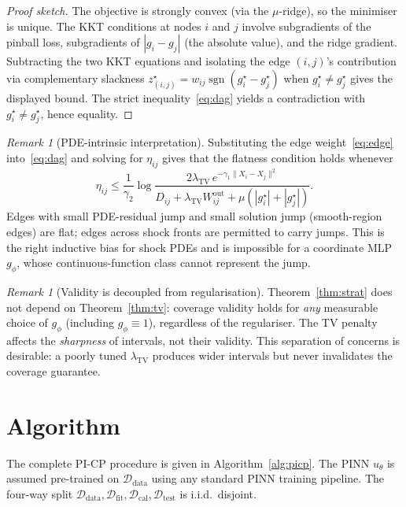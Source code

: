 \documentclass[11pt]{article}
\theoremstyle{definition}
\theoremstyle{remark}
\newtheorem{remark}[theorem]{Remark}
\newcommand{\Ddata}{\mathcal{D}_{\text{data}}}
\newcommand{\Dfit}{\mathcal{D}_{\text{fit}}}
\newcommand{\Dcal}{\mathcal{D}_{\text{cal}}}
\newcommand{\Dtest}{\mathcal{D}_{\text{test}}}
\newcommand{\TV}{\mathrm{TV}}
\begin{document}
\begin{proof}[Proof sketch]
The objective is strongly convex (via the $\mu$-ridge), so the minimiser is unique. The KKT conditions at nodes $i$ and $j$ involve subgradients of the pinball loss, subgradients of $|g_i - g_j|$ (the absolute value), and the ridge gradient. Subtracting the two KKT equations and isolating the edge $(i, j)$'s contribution via complementary slackness $z^\star_{(i,j)} = w_{ij} \operatorname{sgn}(g^\star_i - g^\star_j)$ when $g^\star_i \neq g^\star_j$ gives the displayed bound. The strict inequality~\eqref{eq:dag} yields a contradiction with $g^\star_i \neq g^\star_j$, hence equality.
\end{proof}

\begin{remark}[PDE-intrinsic interpretation]
Substituting the edge weight~\eqref{eq:edge} into~\eqref{eq:dag} and solving for $\eta_{ij}$ gives that the flatness condition holds whenever
\begin{equation}
    \eta_{ij} \leq \frac{1}{\gamma_2} \log\frac{2\lambda_{\TV}\, e^{-\gamma_1 \|X_i - X_j\|^2}}{D_{ij} + \lambda_{\TV} W^{\text{out}}_{ij} + \mu(|g^\star_i| + |g^\star_j|)}.
\end{equation}
Edges with small PDE-residual jump and small solution jump (smooth-region edges) are flat; edges across shock fronts are permitted to carry jumps. This is the right inductive bias for shock PDEs and is impossible for a coordinate MLP $g_\phi$, whose continuous-function class cannot represent the jump.
\end{remark}

\begin{remark}[Validity is decoupled from regularisation]
Theorem~\ref{thm:strat} does not depend on Theorem~\ref{thm:tv}: coverage validity holds for \emph{any} measurable choice of $g_\phi$ (including $g_\phi \equiv 1$), regardless of the regulariser. The TV penalty affects the \emph{sharpness} of intervals, not their validity. This separation of concerns is desirable: a poorly tuned $\lambda_{\TV}$ produces wider intervals but never invalidates the coverage guarantee.
\end{remark}

\section{Algorithm}
\label{sec:algorithm}

The complete PI-CP procedure is given in Algorithm~\ref{alg:picp}. The PINN $u_\theta$ is assumed pre-trained on $\Ddata$ using any standard PINN training pipeline. The four-way split $\Ddata, \Dfit, \Dcal, \Dtest$ is i.i.d.\ disjoint.
\end{document}
